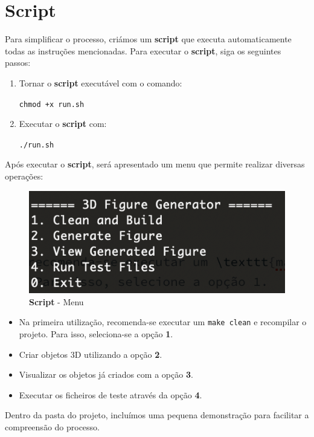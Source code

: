 \documentclass[12pt,a4paper]{report}%
\begin{document}
\section{Script}

Para simplificar o processo, criámos um \textbf{script} que executa automaticamente todas as instruções mencionadas. Para executar o \textbf{script}, siga os seguintes passos:

\begin{enumerate}
    \item Tornar o \textbf{script} executável com o comando:
    \begin{center}
        \texttt{chmod +x run.sh}
    \end{center}
    \item Executar o \textbf{script} com:
    \begin{center}
        \texttt{./run.sh}
    \end{center}
\end{enumerate}

Após executar o \textbf{script}, será apresentado um menu que permite realizar diversas operações:

\begin{figure} [H]
    \centering
    \includegraphics[width=0.5\linewidth]{images/script.png}
    \caption{\textbf{Script} - Menu}
    \label{fig:script-menu}
\end{figure}


\begin{itemize}
    \item Na primeira utilização, recomenda-se executar um \texttt{make clean} e recompilar o projeto. Para isso, seleciona-se a opção \textbf{1}.
    \item Criar objetos 3D utilizando a opção \textbf{2}.
    \item Visualizar os objetos já criados com a opção \textbf{3}.
    \item Executar os ficheiros de teste através da opção \textbf{4}.
\end{itemize}

Dentro da pasta do projeto, incluímos uma pequena demonstração para facilitar a compreensão do processo.
\end{document}

